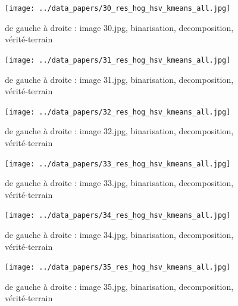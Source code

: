 \documentclass{book}
\begin{document}
\begin{figure}[H]
\begin{center}
\texttt{[image: ../data\_papers/30\_res\_hog\_hsv\_kmeans\_all.jpg]}
\end{center}
\caption{de gauche à droite : image 30.jpg, binarisation, decomposition, vérité-terrain}
\label{30}
\end{figure}
\clearpage


\begin{figure}[H]
\begin{center}
\texttt{[image: ../data\_papers/31\_res\_hog\_hsv\_kmeans\_all.jpg]}
\end{center}
\caption{de gauche à droite : image 31.jpg, binarisation, decomposition, vérité-terrain}
\label{31}
\end{figure}
\clearpage


\begin{figure}[H]
\begin{center}
\texttt{[image: ../data\_papers/32\_res\_hog\_hsv\_kmeans\_all.jpg]}
\end{center}
\caption{de gauche à droite : image 32.jpg, binarisation, decomposition, vérité-terrain}
\label{32}
\end{figure}
\clearpage


\begin{figure}[H]
\begin{center}
\texttt{[image: ../data\_papers/33\_res\_hog\_hsv\_kmeans\_all.jpg]}
\end{center}
\caption{de gauche à droite : image 33.jpg, binarisation, decomposition, vérité-terrain}
\label{33}
\end{figure}
\clearpage


\begin{figure}[H]
\begin{center}
\texttt{[image: ../data\_papers/34\_res\_hog\_hsv\_kmeans\_all.jpg]}
\end{center}
\caption{de gauche à droite : image 34.jpg, binarisation, decomposition, vérité-terrain}
\label{34}
\end{figure}
\clearpage


\begin{figure}[H]
\begin{center}
\texttt{[image: ../data\_papers/35\_res\_hog\_hsv\_kmeans\_all.jpg]}
\end{center}
\caption{de gauche à droite : image 35.jpg, binarisation, decomposition, vérité-terrain}
\label{35}
\end{figure}
\clearpage
\end{document}
